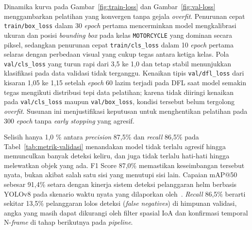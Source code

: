 Dinamika kurva pada Gambar~\ref{fig:train-loss} dan Gambar~\ref{fig:val-loss} menggambarkan pelatihan yang konvergen tanpa gejala \textit{overfit}. Penurunan cepat \texttt{train/box\_loss} dalam 30 \textit{epoch} pertama mencerminkan model mengkalibrasi ukuran dan posisi \textit{bounding box} pada kelas \texttt{MOTORCYCLE} yang dominan secara piksel, sedangkan penurunan cepat \texttt{train/cls\_loss} dalam 10 \textit{epoch} pertama selaras dengan perbedaan visual yang cukup tegas antara ketiga kelas. Pola \texttt{val/cls\_loss} yang turun rapi dari 3,5 ke 1,0 dan tetap stabil menunjukkan klasifikasi pada data validasi tidak terganggu. Kenaikan tipis \texttt{val/dfl\_loss} dari kisaran 1,05 ke 1,15 setelah \textit{epoch} 60 lazim terjadi pada DFL saat model semakin tegas mengikuti distribusi tepi data pelatihan; karena tidak diiringi kenaikan pada \texttt{val/cls\_loss} maupun \texttt{val/box\_loss}, kondisi tersebut belum tergolong \textit{overfit}. Susunan ini menjustifikasi keputusan untuk menghentikan pelatihan pada 300 \textit{epoch} tanpa \textit{early stopping} yang agresif.

Selisih hanya 1,0 \% antara \textit{precision} 87,5\% dan \textit{recall} 86,5\% pada Tabel~\ref{tab:metrik-validasi} menandakan model tidak terlalu agresif hingga memunculkan banyak deteksi keliru, dan juga tidak terlalu hati-hati hingga melewatkan objek yang ada. F1 Score 87,0\% memastikan keseimbangan tersebut nyata, bukan akibat salah satu sisi yang menutupi sisi lain. Capaian mAP@50 sebesar 91,4\% setara dengan kinerja sistem deteksi pelanggaran helm berbasis YOLOv8 pada skenario waktu nyata yang dilaporkan oleh~\cite{aboah2023helmet}. \textit{Recall} 86,5\% berarti sekitar 13,5\% pelanggaran lolos deteksi (\textit{false negatives}) di himpunan validasi, angka yang masih dapat dikurangi oleh filter spasial IoA dan konfirmasi temporal N-\textit{frame} di tahap berikutnya pada \textit{pipeline}.

